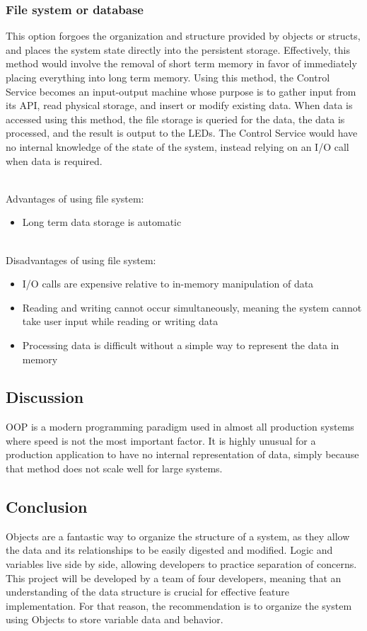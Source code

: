\documentclass[onecolumn, draftclsnofoot,10pt, compsoc]{IEEEtran}
\begin{document}
			\subsubsection{File system or database}
			This option forgoes the organization and structure provided by objects or structs, and places the system state directly into the persistent storage.
			Effectively, this method would involve the removal of short term memory in favor of immediately placing everything into long term memory.
			Using this method, the Control Service becomes an input-output machine whose purpose is to gather input from its API, read physical storage, and insert or modify existing data.
			When data is accessed using this method, the file storage is queried for the data, the data is processed, and the result is output to the LEDs.
			The Control Service would have no internal knowledge of the state of the system, instead relying on an I/O call when data is required.

			\noindent \\Advantages of using file system:
			\begin{itemize}
				\item Long term data storage is automatic
			\end{itemize}

			\noindent \\Disadvantages of using file system:
			\begin{itemize}
				\item I/O calls are expensive relative to in-memory manipulation of data
				\item Reading and writing cannot occur simultaneously, meaning the system cannot take user input while reading or writing data
				\item Processing data is difficult without a simple way to represent the data in memory
			\end{itemize}


			\subsection{Discussion}
			OOP is a modern programming paradigm used in almost all production systems where speed is not the most important factor.
			It is highly unusual for a production application to have no internal representation of data, simply because that method does not scale well for large systems.

			\subsection{Conclusion}
			Objects are a fantastic way to organize the structure of a system, as they allow the data and its relationships to be easily digested and modified.
			Logic and variables live side by side, allowing developers to practice separation of concerns.
			This project will be developed by a team of four developers, meaning that an understanding of the data structure is crucial for effective feature implementation.
			For that reason, the recommendation is to organize the system using Objects to store variable data and behavior.


		
		
\end{document}
